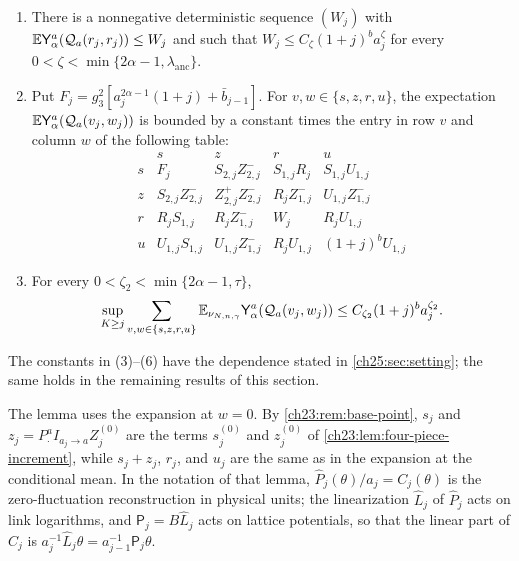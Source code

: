 \begin{lemma}
\begin{enumerate}
\[\begin{split}
\end{split}
\]
Then $\norm{\Xnorm\alpha a(s_j)}_p\le S_{p,j}$, $\norm{\Hnorm\sigma a(z_j(0))}_p\le Z^-_{p,j}$, $\norm{\Xnorm\alpha a(z_j)}_p\le Z^+_{p,j}$, $\Xnorm\alpha a(r_j)\le R_j$ pathwise, and $\norm{\Hnorm\sigma a(I_{a_j\to a}U_j^0)}_p\le U_{p,j}$ and $\norm{\Xnorm\alpha a(u_j)}_p\le U_{p,j}$. The first three bounds also hold conditionally on $\mathcal F_{j-1}$, for every value of the coarser field. Further, $\mathcal U_j=\Hnorm\sigma a(I_{a_j\to a}U_j^0)$ satisfies $\mathcal U_j\le C(1+j)^b$ pathwise.
\item There is a nonnegative deterministic sequence $(W_j)$ with $\mathbb E\mathsf Y_{\alpha}^{a}(\mathcal Q_{a}(r_j,r_j))\le W_j$ and such that $W_j\le C_\zeta(1+j)^ba_j^\zeta$ for every $0<\zeta<\min\{2\alpha-1,\lambda_{\mathrm{anc}}\}$.
\item Put $F_j=g_3^2[a_j^{2\alpha-1}(1+j)+\bar b_{j-1}]$. For $v,w\in\{s,z,r,u\}$, the expectation $\mathbb E\mathsf Y_{\alpha}^{a}(\mathcal Q_{a}(v_j,w_j))$ is bounded by a constant times the entry in row $v$ and column $w$ of the following table:
\[
\begin{array}{c|cccc}
 &s&z&r&u\\\hline
 s&F_j&S_{2,j}Z^-_{2,j}&S_{1,j}R_j&S_{1,j}U_{1,j}\\
 z&S_{2,j}Z^-_{2,j}&Z^+_{2,j}Z^-_{2,j}&R_jZ^-_{1,j}&U_{1,j}Z^-_{1,j}\\
 r&R_jS_{1,j}&R_jZ^-_{1,j}&W_j&R_jU_{1,j}\\
 u&U_{1,j}S_{1,j}&U_{1,j}Z^-_{1,j}&R_jU_{1,j}&(1+j)^bU_{1,j}
\end{array}
\]
\item For every $0<\zeta_2<\min\{2\alpha-1,\tau\}$,
\[
 \sup_{K\ge j}\sum_{v,w\in\{s,z,r,u\}}\mathbb E_{\nu_{N,n,\gamma}}\mathsf Y_{\alpha}^{a}(\mathcal Q_{a}(v_j,w_j))\le C_{\zeta_2}(1+j)^ba_j^{\zeta_2}.
\]
\end{enumerate}
The constants in (3)--(6) have the dependence stated in \cref{ch25:sec:setting}; the same holds in the remaining results of this section.
\end{lemma}

The lemma uses the expansion at $w=0$. By \cref{ch23:rem:base-point}, $s_j$ and $z_j=P_\cdot^aI_{a_j\to a}Z_j^{(0)}$ are the terms $s_j^{(0)}$ and $z_j^{(0)}$ of \cref{ch23:lem:four-piece-increment}, while $s_j+z_j$, $r_j$, and $u_j$ are the same as in the expansion at the conditional mean. In the notation of that lemma, $\widehat P_j(\theta)/a_j=C_j(\theta)$ is the zero-fluctuation reconstruction in physical units; the linearization $\widehat L_j$ of $\widehat P_j$ acts on link logarithms, and $\mathsf P_j=B\widehat L_j$ acts on lattice potentials, so that the linear part of $C_j$ is $a_j^{-1}\widehat L_j\theta=a_{j-1}^{-1}\mathsf P_j\theta$.

